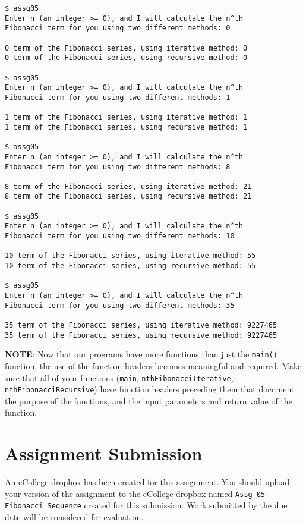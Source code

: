 \documentclass[11pt]{article}
\begin{document}
\begin{verbatim}
$ assg05
Enter n (an integer >= 0), and I will calculate the n^th
Fibonacci term for you using two different methods: 0

0 term of the Fibonacci series, using iterative method: 0
0 term of the Fibonacci series, using recursive method: 0

$ assg05
Enter n (an integer >= 0), and I will calculate the n^th
Fibonacci term for you using two different methods: 1

1 term of the Fibonacci series, using iterative method: 1
1 term of the Fibonacci series, using recursive method: 1

$ assg05
Enter n (an integer >= 0), and I will calculate the n^th
Fibonacci term for you using two different methods: 8

8 term of the Fibonacci series, using iterative method: 21
8 term of the Fibonacci series, using recursive method: 21

$ assg05
Enter n (an integer >= 0), and I will calculate the n^th
Fibonacci term for you using two different methods: 10

10 term of the Fibonacci series, using iterative method: 55
10 term of the Fibonacci series, using recursive method: 55

$ assg05
Enter n (an integer >= 0), and I will calculate the n^th
Fibonacci term for you using two different methods: 35

35 term of the Fibonacci series, using iterative method: 9227465
35 term of the Fibonacci series, using recursive method: 9227465
\end{verbatim}


\textbf{NOTE}: Now that our programs have more functions than just the
\verb~main()~ function, the use of the function headers becomes meaningful
and required.  Make sure that all of your functions (\verb~main~,
\verb~nthFibonacciIterative~, \verb~nthFibonacciRecursive~) have function
headers preceding them that document the purpose of the functions, and
the input parameters and return value of the function.
\section*{Assignment Submission}
\label{sec-4}


An eCollege dropbox has been created for this assignment.  You should
upload your version of the assignment to the eCollege dropbox named
\verb~Assg 05 Fibonacci Sequence~ created for this submission.  Work
submitted by the due date will be considered for evaluation.
\end{document}
